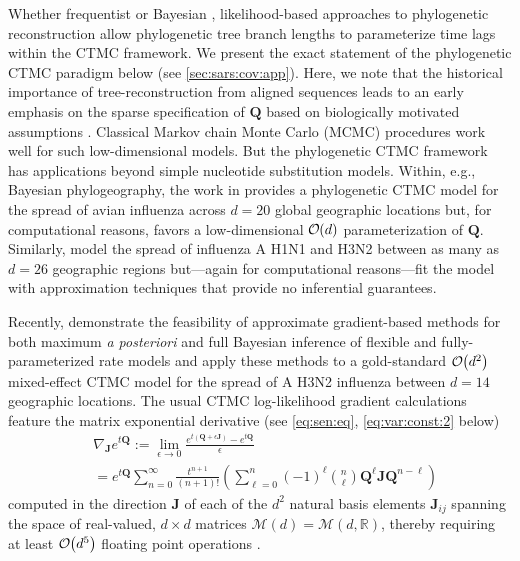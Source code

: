 \documentclass[9pt,twocolumn,twoside]{pnas-new}
\newcommand{\order}[1]{{\cal O}\hspace{-0.2em}\left( #1 \right)}
\newcommand{\bbR}{{\mathbb R}}
\newcommand{\?}{\textbf{?}}
\newcommand{\QQ}{\mathbf{Q}}
\newcommand{\JJ}{\mathbf{J}}
\begin{document}
Whether frequentist \cite{felsenstein1981evolutionary} or Bayesian
\cite{sinsheimer1996bayesian, yang1997bayesian, mau1999bayesian,
  suchard2001bayesian}, likelihood-based approaches to phylogenetic
reconstruction allow phylogenetic tree branch lengths to parameterize
time lags within the CTMC framework. We present the exact statement of
the phylogenetic CTMC paradigm below (see \cref{sec:sars:cov:app}).
Here, we note that the historical importance of tree-reconstruction
from aligned sequences leads to an early emphasis on the
sparse specification of $\QQ$ based on biologically motivated
assumptions
\cite{jukes1969evolution,kimura1980simple,hasegawa1985dating}.
Classical Markov chain Monte Carlo (MCMC) procedures
\cite{metropolis1953equation,hastings1970monte} work well for such
low-dimensional models.  But the phylogenetic CTMC framework has
applications beyond simple nucleotide substitution models. Within,
e.g., Bayesian phylogeography, the work in \cite{lemey2009bayesian}
provides a phylogenetic CTMC model for the spread of avian influenza
across $d=20$ global geographic locations but, for computational
reasons, favors a low-dimensional $\order{d}$ parameterization of
$\QQ$. Similarly, \cite{lemey2014unifying} model the spread of
influenza A H1N1 and H3N2 between as many as $d=26$ geographic regions
but---again for computational reasons---fit the model with
approximation techniques that provide no inferential guarantees.

Recently, \cite{magee2023random} demonstrate the feasibility of
approximate gradient-based methods for both maximum \emph{a
  posteriori} and full Bayesian inference of flexible and
fully-parameterized rate models and apply these methods to a
gold-standard $\order{d^2}$ mixed-effect CTMC model for the spread of
A H3N2 influenza between $d=14$ geographic locations. The usual
CTMC log-likelihood gradient calculations feature the matrix
exponential derivative (see \eqref{eq:sen:eq}, \eqref{eq:var:const:2} below)
\begin{align}
\label{eq:grad:def}
  &\nabla_{\JJ} e^{t \QQ}
    := \lim_{\epsilon \to 0}
    \frac{e^{t (\QQ+ \epsilon \JJ)} - e^{t\QQ} }{\epsilon} \\
  &=  e^{t \QQ} \sum_{n = 0}^\infty \frac{t^{n+1}}{(n+1)!}  
    \left( \sum_{\ell = 0}^n
    (-1)^\ell \binom{n}{\ell} \QQ^\ell \JJ \QQ^{n -\ell}\right)
    \label{eq:grad:series}
\end{align}
computed in the direction $\JJ$ of each of the $d^2$ natural basis
elements $\JJ_{ij}$ spanning the space of real-valued, $d\times d$
matrices ${\mathcal M}(d)={\mathcal M}(d,\bbR)$, thereby requiring at least $\order{d^5}$
floating point operations \cite{najfeld1995derivatives}.
\end{document}
